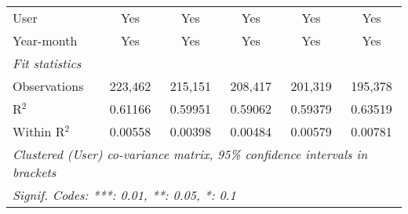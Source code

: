 \begin{table}[htbp]
\begin{threeparttable}[b]
\begin{tabular}{lccccc}
         User                         & Yes             & Yes            & Yes             & Yes             & Yes\\  
         Year-month                   & Yes             & Yes            & Yes             & Yes             & Yes\\  
         \midrule
         \emph{Fit statistics}\\
         Observations                 & 223,462         & 215,151        & 208,417         & 201,319         & 195,378\\  
         R$^2$                        & 0.61166         & 0.59951        & 0.59062         & 0.59379         & 0.63519\\  
         Within R$^2$                 & 0.00558         & 0.00398        & 0.00484         & 0.00579         & 0.00781\\  
         \midrule \midrule
         \multicolumn{6}{l}{\emph{Clustered (User) co-variance matrix, 95\% confidence intervals in brackets}}\\
         \multicolumn{6}{l}{\emph{Signif. Codes: ***: 0.01, **: 0.05, *: 0.1}}\\
      \end{tabular}
   \end{threeparttable}
\end{table}



